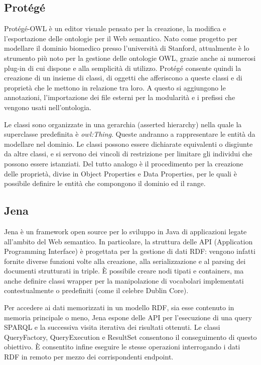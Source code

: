\documentclass[Lau,binding=0.6cm,noexaminfo,oneside]{sapthesis}
\begin{document}
\subsection{Protégé}

Protégé-OWL è un editor visuale pensato per la creazione, la modifica e l'esportazione delle ontologie per il Web semantico. Nato come progetto per modellare il dominio biomedico presso l'università di Stanford, attualmente è lo strumento più noto per la gestione delle ontologie OWL, grazie anche ai numerosi plug-in di cui dispone e alla semplicità di utilizzo. Protégé consente quindi la creazione di un insieme di classi, di oggetti che afferiscono a queste classi e di proprietà che le mettono in relazione tra loro. A questo si aggiungono le annotazioni, l'importazione dei file esterni per la modularità e i prefissi che vengono usati nell'ontologia.\medskip

Le classi sono organizzate in una gerarchia (asserted hierarchy) nella quale la superclasse predefinita è {\it owl:Thing}. Queste andranno a rappresentare le entità da modellare nel dominio. Le classi possono essere dichiarate equivalenti o disgiunte da altre classi, e si servono dei vincoli di restrizione per limitare gli individui che possono essere istanziati. Del tutto analogo è il procedimento per la creazione delle proprietà, divise in Object Properties e Data Properties, per le quali è possibile definire le entità che compongono il dominio ed il range.

\subsection{Jena}

Jena è un framework open source per lo sviluppo in Java di applicazioni legate all'ambito del Web semantico. In particolare, la struttura delle API (Application Programming Interface) è progettata per la gestione di dati RDF: vengono infatti fornite diverse funzioni volte alla creazione, alla serializzazione e al parsing dei documenti strutturati in triple. \MakeUppercase{è} possibile creare nodi tipati e containers, ma anche definire classi wrapper per la manipolazione di vocabolari implementati contestualmente o predefiniti (come il celebre Dublin Core).\medskip

Per accedere ai dati memorizzati in un modello RDF, sia esse contenuto in memoria principale o meno, Jena espone delle API per l'esecuzione di una query SPARQL e la successiva visita iterativa dei risultati ottenuti. Le classi QueryFactory, QueryExecution e ResultSet consentono il conseguimento di questo obiettivo. \MakeUppercase{è} consentito infine eseguire le stesse operazioni interrogando i dati RDF in remoto per mezzo dei corrispondenti endpoint.
\end{document}
